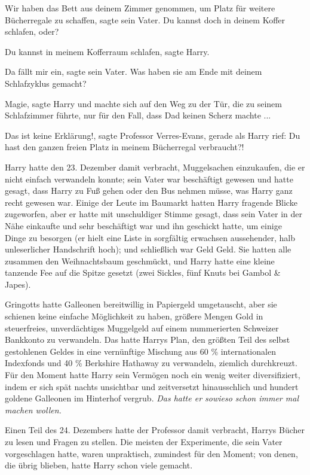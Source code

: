 \glqq{}Wir haben das Bett aus deinem Zimmer genommen, um Platz für weitere
Bücherregale zu schaffen\grqq{}, sagte sein Vater. \glqq{}Du kannst doch in
deinem Koffer schlafen, oder?\grqq{}

\glqq{}Du kannst in meinem Kofferraum schlafen\grqq{}, sagte Harry.

\glqq{}Da fällt mir ein\grqq{}, sagte sein Vater. \glqq{}Was haben sie am Ende mit
deinem Schlafzyklus gemacht?\grqq{}

\glqq{}Magie\grqq{}, sagte Harry und machte sich auf den Weg zu der Tür, die zu
seinem Schlafzimmer führte, nur für den Fall, dass Dad keinen Scherz machte ...

\glqq{}Das ist keine Erklärung!\grqq{}, sagte Professor Verres-Evans, gerade als
Harry rief: \glqq{}Du hast den ganzen freien Platz in meinem Bücherregal
verbraucht?!\grqq{}

Harry hatte den 23. Dezember damit verbracht, Muggelsachen einzukaufen, die er
nicht einfach verwandeln konnte; sein Vater war beschäftigt gewesen und hatte
gesagt, dass Harry zu Fuß gehen oder den Bus nehmen müsse, was Harry ganz recht
gewesen war. Einige der Leute im Baumarkt hatten Harry fragende Blicke
zugeworfen, aber er hatte mit unschuldiger Stimme gesagt, dass sein Vater in der
Nähe einkaufte und sehr beschäftigt war und ihn geschickt hatte, um einige Dinge
zu besorgen (er hielt eine Liste in sorgfältig erwachsen aussehender, halb
unleserlicher Handschrift hoch); und schließlich war Geld Geld. Sie hatten alle
zusammen den Weihnachtsbaum geschmückt, und Harry hatte eine kleine tanzende Fee
auf die Spitze gesetzt (zwei Sickles, fünf Knuts bei Gambol \& Japes).

Gringotts hatte Galleonen bereitwillig in Papiergeld umgetauscht, aber sie
schienen keine einfache Möglichkeit zu haben, größere Mengen Gold in
steuerfreies, unverdächtiges Muggelgeld auf einem nummerierten Schweizer
Bankkonto zu verwandeln. Das hatte Harrys Plan, den größten Teil des selbst
gestohlenen Geldes in eine vernünftige Mischung aus 60 \% internationalen
Indexfonds und 40 \% Berkshire Hathaway zu verwandeln, ziemlich durchkreuzt. Für
den Moment hatte Harry sein Vermögen noch ein wenig weiter diversifiziert, indem
er sich spät nachts unsichtbar und zeitversetzt hinausschlich und hundert
goldene Galleonen im Hinterhof vergrub.
\emph{Das hatte er sowieso schon immer mal machen wollen.}

Einen Teil des 24. Dezembers hatte der Professor damit verbracht, Harrys Bücher
zu lesen und Fragen zu stellen. Die meisten der Experimente, die sein Vater
vorgeschlagen hatte, waren unpraktisch, zumindest für den Moment; von denen, die
übrig blieben, hatte Harry schon viele gemacht.

